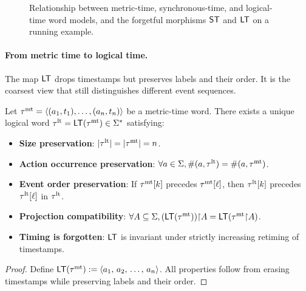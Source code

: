 \begin{figure}[t]
\caption{Relationship between metric-time, synchronous-time, and logical-time word models, and the forgetful morphisms $\mathsf{ST}$ and $\mathsf{LT}$ on a running example.}
\label{fig:word-models-summary}
\end{figure}

\paragraph{From metric time to logical time.}
The map \(\mathsf{LT}\) drops timestamps but preserves labels and their order. It is the coarsest view that still distinguishes different event sequences.

\begin{lemma}
Let \(\tau^{\mathrm{mt}}=\langle (a_1,t_1),\dots,(a_{n},t_{n}) \rangle  \) be a metric-time word. There exists a unique logical word \(\tau^{\mathrm{lt}}=\mathsf{LT}(\tau^{\mathrm{mt}})\in\Sigma^{*}\) satisfying:
\begin{itemize}
  \item \textbf{Size preservation}: \( |\tau^{\mathrm{lt}}| = |\tau^{\mathrm{mt}}| = n \).
  \item \textbf{Action occurrence preservation}: \( \forall a\in\Sigma, \#(a,\tau^{\mathrm{lt}}) = \#(a,\tau^{\mathrm{mt}}) \).
  \item \textbf{Event order preservation}: If \(\tau^{\mathrm{mt}}[k]\) precedes \(\tau^{\mathrm{mt}}[\ell]\), then \(\tau^{\mathrm{lt}}[k]\) precedes \(\tau^{\mathrm{lt}}[\ell]\) in \(\tau^{\mathrm{lt}}\).
  \item \textbf{Projection compatibility}: \( \forall A\subseteq\Sigma, (\mathsf{LT}(\tau^{\mathrm{mt}})){\upharpoonright}A = \mathsf{LT}(\tau^{\mathrm{mt}}{\upharpoonright}A) \).
  \item \textbf{Timing is forgotten}: \(\mathsf{LT}\) is invariant under strictly increasing retiming of timestamps.
\end{itemize}
\end{lemma}

\begin{proof}
\;
Define \(\mathsf{LT}(\tau^{\mathrm{mt}}):=\langle a_1,\,a_2,\,\dots,\,a_{n} \rangle \). All properties follow from erasing timestamps while preserving labels and their order.
\end{proof}


